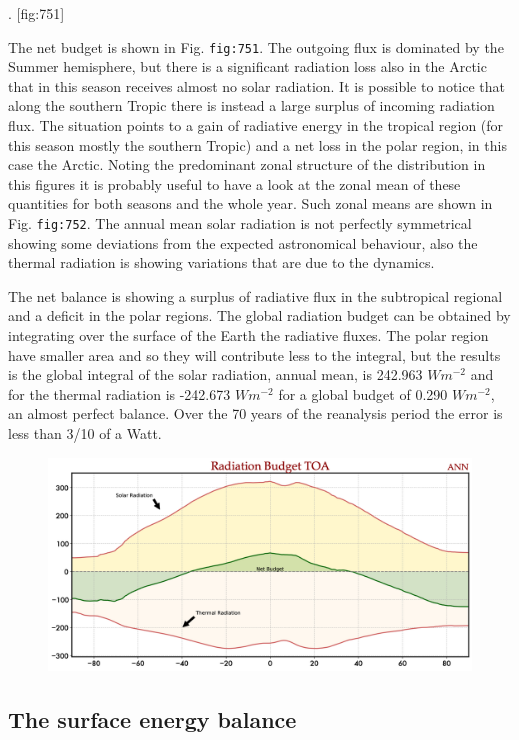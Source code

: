 . {[}fig:751{]}

The net budget is shown in Fig. \texttt{fig:751}. The outgoing flux is
dominated by the Summer hemisphere, but there is a significant radiation
loss also in the Arctic that in this season receives almost no solar
radiation. It is possible to notice that along the southern Tropic there
is instead a large surplus of incoming radiation flux. The situation
points to a gain of radiative energy in the tropical region (for this
season mostly the southern Tropic) and a net loss in the polar region,
in this case the Arctic. Noting the predominant zonal structure of the
distribution in this figures it is probably useful to have a look at the
zonal mean of these quantities for both seasons and the whole year. Such
zonal means are shown in Fig. \texttt{fig:752}. The annual mean solar
radiation is not perfectly symmetrical showing some deviations from the
expected astronomical behaviour, also the thermal radiation is showing
variations that are due to the dynamics.

The net balance is showing a surplus of radiative flux in the
subtropical regional and a deficit in the polar regions. The global
radiation budget can be obtained by integrating over the surface of the
Earth the radiative fluxes. The polar region have smaller area and so
they will contribute less to the integral, but the results is the global
integral of the solar radiation, annual mean, is 242.963 \(W m^{-2}\)
and for the thermal radiation is -242.673 \(W m^{-2}\) for a global
budget of 0.290 \(W m^{-2}\), an almost perfect balance. Over the 70
years of the reanalysis period the error is less than 3/10 of a Watt.

\begin{figure}
\centering
\includegraphics[width = .7 \textwidth]{figs/GD/BudgetTOAANN.png}
\caption{} \label{fig:}
\end{figure}

\subsection{The surface energy
balance}\label{the-surface-energy-balance}

